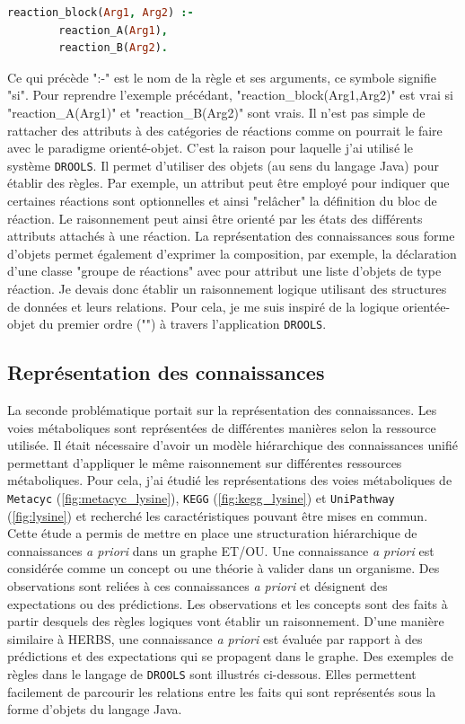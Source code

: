 \begin{refsegment}
\begin{lstlisting}[basicstyle=\small\normalfont\ttfamily,language=Prolog]
    reaction_block(Arg1, Arg2) :-
        reaction_A(Arg1),
        reaction_B(Arg2).
\end{lstlisting}

Ce qui précède  ":-" est le nom de la règle et ses arguments, ce symbole signifie "si". Pour reprendre l'exemple précédant, "reaction\_block(Arg1,Arg2)" est vrai si "reaction\_A(Arg1)" et "reaction\_B(Arg2)" sont vrais. Il n'est pas simple de rattacher des attributs à des catégories de réactions comme on pourrait le faire avec le paradigme orienté-objet. C'est la raison pour laquelle j'ai utilisé le système \texttt{DROOLS}. Il permet d'utiliser des objets (au sens du langage Java) pour établir des règles. Par exemple, un attribut peut être employé pour indiquer que certaines réactions sont optionnelles et ainsi "relâcher" la définition du bloc de réaction. Le raisonnement peut ainsi être orienté par les états des différents attributs attachés à une réaction. La représentation des connaissances sous forme d'objets permet également d'exprimer la composition, par exemple, la déclaration d'une classe "groupe de réactions" avec pour attribut une liste d'objets de type réaction. Je devais donc établir un raisonnement logique utilisant des structures de données et leurs relations. Pour cela, je me suis inspiré de la logique orientée-objet du premier ordre ("") \cite{amir1999object} à travers l'application \texttt{DROOLS}.

\subsection{Représentation des connaissances}

La seconde problématique portait sur la représentation des connaissances. Les voies métaboliques sont représentées de différentes manières selon la ressource utilisée. Il était nécessaire d'avoir un modèle hiérarchique des connaissances unifié permettant d'appliquer le même raisonnement sur différentes ressources métaboliques. Pour cela, j'ai étudié les représentations des voies métaboliques de \texttt{Metacyc} (\cref{fig:metacyc_lysine}), \texttt{KEGG} (\cref{fig:kegg_lysine}) et \texttt{UniPathway} (\cref{fig:lysine}) et recherché les caractéristiques pouvant être mises en commun. Cette étude a permis de mettre en place une structuration hiérarchique de connaissances \textit{a priori} dans un graphe ET/OU. Une connaissance \textit{a priori} est considérée comme un concept ou une théorie à valider dans un organisme. Des observations sont reliées à ces connaissances \textit{a priori} et désignent des expectations ou des prédictions. Les observations et les concepts sont des faits à partir desquels des règles logiques vont établir un raisonnement. D'une manière similaire à HERBS, une connaissance \textit{a priori} est évaluée par rapport à des prédictions et des expectations qui se propagent dans le graphe. Des exemples de règles dans le langage de \texttt{DROOLS} sont illustrés ci-dessous. Elles permettent facilement de parcourir les relations entre les faits qui sont représentés sous la forme d'objets du langage Java.


\end{refsegment}
